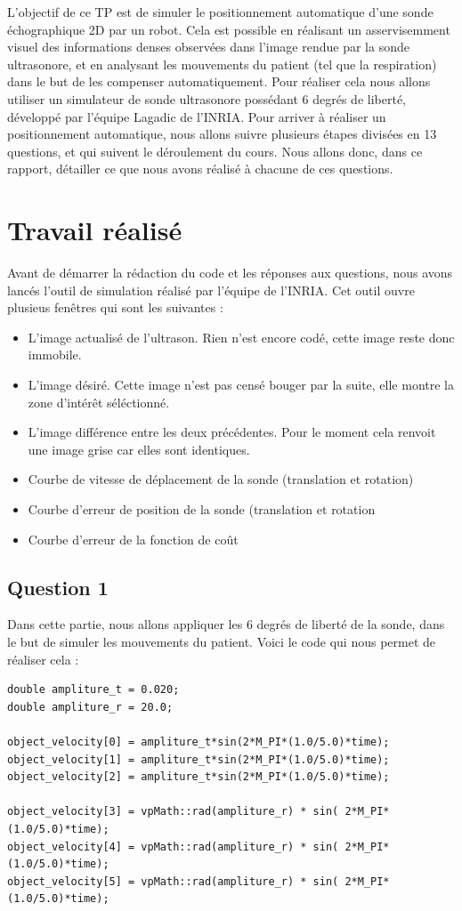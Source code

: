 \documentclass[a4paper,11pt]{article}
\begin{document}
L'objectif de ce TP est de simuler le positionnement automatique d'une sonde \'echographique 2D par un robot. Cela est possible en r\'ealisant un asservisemment visuel des informations denses observ\'ees dans l'image rendue par la sonde ultrasonore, et en analysant les mouvements du patient (tel que la respiration) dans le but de les compenser automatiquement.
Pour r\'ealiser cela nous allons utiliser un simulateur de sonde ultrasonore poss\'edant 6 degr\'es de libert\'e, d\'evelopp\'e par l'\'equipe Lagadic de l'INRIA. Pour arriver \`a r\'ealiser un positionnement automatique, nous allons suivre plusieurs \'etapes divis\'ees en 13 questions, et qui suivent le d\'eroulement du cours. Nous allons donc, dans ce rapport, d\'etailler ce que nous avons r\'ealis\'e \`a chacune de ces questions.


\section{Travail r\'ealis\'e}
Avant de d\'emarrer la r\'edaction du code et les r\'eponses aux questions, nous avons lanc\'es l'outil de simulation r\'ealis\'e par l'\'equipe de l'INRIA. Cet outil ouvre plusieus fen\^etres qui sont les suivantes :
\begin{itemize}
\item L'image actualis\'e de l'ultrason. Rien n'est encore cod\'e, cette image reste donc immobile.
\item L'image d\'esir\'e. Cette image n'est pas cens\'e bouger par la suite, elle montre la zone d'int\'er\^et s\'el\'ectionn\'e.
\item L'image diff\'erence entre les deux pr\'ec\'edentes. Pour le moment cela renvoit une image grise car elles sont identiques.
\item Courbe de vitesse de d\'eplacement de la sonde (translation et rotation)
\item Courbe d'erreur de position de la sonde (translation et rotation
\item Courbe d'erreur de la fonction de co\^ut
\end{itemize}

\subsection{Question 1}
Dans cette partie, nous allons appliquer les 6 degr\'es de libert\'e de la sonde, dans le but de simuler les mouvements du patient. Voici le code qui nous permet de r\'ealiser cela :
\begin{verbatim}
double ampliture_t = 0.020;
double ampliture_r = 20.0;

object_velocity[0] = ampliture_t*sin(2*M_PI*(1.0/5.0)*time);
object_velocity[1] = ampliture_t*sin(2*M_PI*(1.0/5.0)*time);
object_velocity[2] = ampliture_t*sin(2*M_PI*(1.0/5.0)*time);

object_velocity[3] = vpMath::rad(ampliture_r) * sin( 2*M_PI*(1.0/5.0)*time);
object_velocity[4] = vpMath::rad(ampliture_r) * sin( 2*M_PI*(1.0/5.0)*time);
object_velocity[5] = vpMath::rad(ampliture_r) * sin( 2*M_PI*(1.0/5.0)*time);
\end{verbatim}
\end{document}
